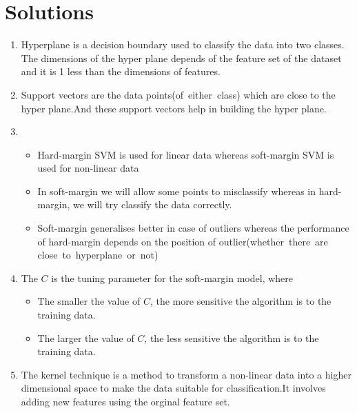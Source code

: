\documentclass[journal,12pt,onecolumn]{IEEEtran}
\theoremstyle{remark}
\numberwithin{equation}{section}
\begin{document}
	     \section{Solutions}
	       \begin{enumerate}
	         \item Hyperplane is a decision boundary used to classify the data into two classes. The dimensions of the hyper plane depends of the feature set of the dataset and it is 1 less than the dimensions of features.
	         \item Support vectors are the data points(of\, either\, class) which are close to the hyper plane.And these support vectors help in building the hyper plane.
	         \item 
		      \begin{itemize}
			\item Hard-margin SVM is used for linear data whereas soft-margin SVM is used for non-linear data
		        \item In soft-margin we will allow some points to misclassify whereas in hard-margin, we will try classify the data correctly.
		        \item Soft-margin generalises better in case of outliers whereas the performance of hard-margin depends on the position of outlier(whether\, there\, are\, close\, to\, hyperplane\, or\, not)
		      \end{itemize}
	          \item The $C$ is the tuning parameter for the soft-margin model, where
			   \begin{itemize}
			     \item The smaller the value of $C$, the more sensitive the algorithm is to the training data.
			     \item The larger the value of $C$, the less sensitive the algorithm is to the training data.
		           \end{itemize}
	          \item The kernel technique is a method to transform a non-linear data into a higher dimensional space to make the data suitable for classification.It involves adding new features using the orginal feature set.
	        \end{enumerate}
      
\end{document}
